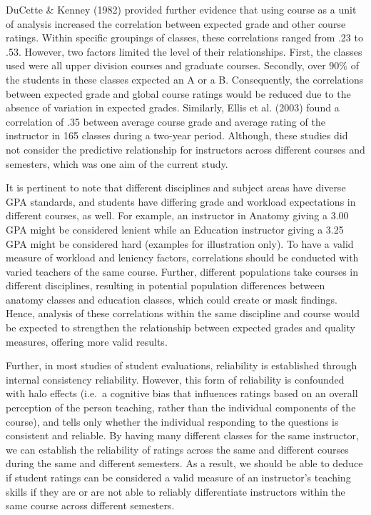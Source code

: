 \documentclass[man]{apa6}
\theoremstyle{definition}
\theoremstyle{definition}
\theoremstyle{definition}
\theoremstyle{remark}
\begin{document}
DuCette \& Kenney (1982) provided further evidence that using course as
a unit of analysis increased the correlation between expected grade and
other course ratings. Within specific groupings of classes, these
correlations ranged from .23 to .53. However, two factors limited the
level of their relationships. First, the classes used were all upper
division courses and graduate courses. Secondly, over 90\% of the
students in these classes expected an A or a B. Consequently, the
correlations between expected grade and global course ratings would be
reduced due to the absence of variation in expected grades. Similarly,
Ellis et al. (2003) found a correlation of .35 between average course
grade and average rating of the instructor in 165 classes during a
two-year period. Although, these studies did not consider the predictive
relationship for instructors across different courses and semesters,
which was one aim of the current study.

It is pertinent to note that different disciplines and subject areas
have diverse GPA standards, and students have differing grade and
workload expectations in different courses, as well. For example, an
instructor in Anatomy giving a 3.00 GPA might be considered lenient
while an Education instructor giving a 3.25 GPA might be considered hard
(examples for illustration only). To have a valid measure of workload
and leniency factors, correlations should be conducted with varied
teachers of the same course. Further, different populations take courses
in different disciplines, resulting in potential population differences
between anatomy classes and education classes, which could create or
mask findings. Hence, analysis of these correlations within the same
discipline and course would be expected to strengthen the relationship
between expected grades and quality measures, offering more valid
results.

Further, in most studies of student evaluations, reliability is
established through internal consistency reliability. However, this form
of reliability is confounded with halo effects (i.e.~a cognitive bias
that influences ratings based on an overall perception of the person
teaching, rather than the individual components of the course), and
tells only whether the individual responding to the questions is
consistent and reliable. By having many different classes for the same
instructor, we can establish the reliability of ratings across the same
and different courses during the same and different semesters. As a
result, we should be able to deduce if student ratings can be considered
a valid measure of an instructor's teaching skills if they are or are
not able to reliably differentiate instructors within the same course
across different semesters.
\end{document}
